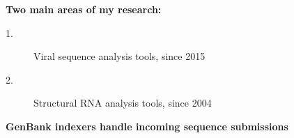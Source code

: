 \documentclass[landscape]{slides}
\begin{document}
\begin{slide}
\begin{center}
\Large
  \textbf{Two main areas of my research:}

\begin{description}
\item[1.] Viral sequence analysis tools, since 2015
\item[2.] Structural RNA analysis tools, since 2004
\end{description}

\end{center}
\vfill
\end{slide}
\begin{slide}
\begin{center}
\large{\textbf{GenBank indexers handle incoming sequence submissions}}
\end{center}


\vfill
\end{slide}
\end{document}

